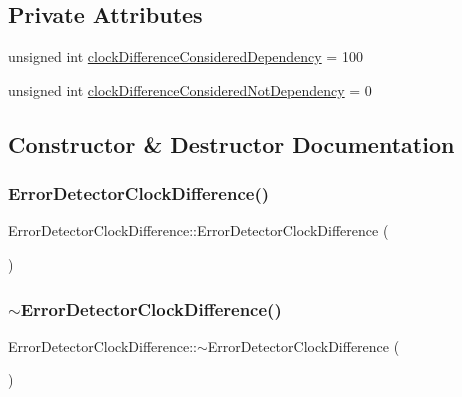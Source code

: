 \subsection*{Private Attributes}
\begin{DoxyCompactItemize}
\item 
unsigned int \hyperlink{classErrorDetectorClockDifference_a0d2a3c4111e8bb4b3c232aacca9a0062}{clock\+Difference\+Considered\+Dependency} = 100
\item 
unsigned int \hyperlink{classErrorDetectorClockDifference_aa733fc7d2023d62a7418ca20e01e9f5a}{clock\+Difference\+Considered\+Not\+Dependency} = 0
\end{DoxyCompactItemize}


\subsection{Constructor \& Destructor Documentation}
\mbox{\label{classErrorDetectorClockDifference_a5edb355be9179cd604d3e7f946846c55}} 
\subsubsection{\texorpdfstring{Error\+Detector\+Clock\+Difference()}{ErrorDetectorClockDifference()}}
{\footnotesize\ttfamily Error\+Detector\+Clock\+Difference\+::\+Error\+Detector\+Clock\+Difference (\begin{DoxyParamCaption}{ }\end{DoxyParamCaption})}

\mbox{\label{classErrorDetectorClockDifference_a19bda307bcb9a8974a97fdf56fb77b8f}} 
\subsubsection{\texorpdfstring{$\sim$\+Error\+Detector\+Clock\+Difference()}{~ErrorDetectorClockDifference()}}
{\footnotesize\ttfamily Error\+Detector\+Clock\+Difference\+::$\sim$\+Error\+Detector\+Clock\+Difference (\begin{DoxyParamCaption}{ }\end{DoxyParamCaption})\hspace{0.3cm}{\ttfamily [virtual]}}



